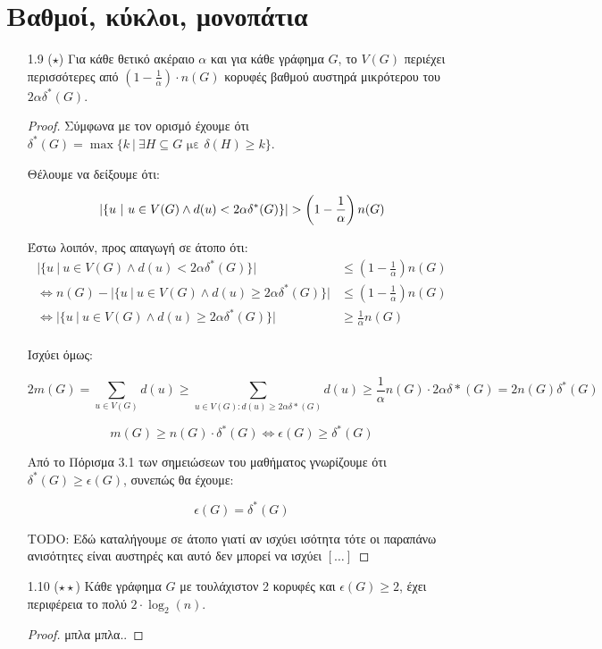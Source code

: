 \documentclass[a4paper, oneside, 11pt]{article}
\begin{document}


\section{Βαθμοί, κύκλοι, μονοπάτια}

\begin{enumerate}
\item[1.9 ($\star$)]
   Για κάθε θετικό ακέραιο $\alpha$ και για κάθε γράφημα $G$, το $V(G)$
   περιέχει περισσότερες από $\left( 1-\frac1\alpha \right) \cdot n(G)$
   κορυφές βαθμού αυστηρά μικρότερου του $2\alpha\delta^*(G)$.

   \begin{proof}
      Σύμφωνα με τον ορισμό έχουμε ότι
      $\delta^*(G) = \max \{ k\ |\ \exists H \subseteq G \text{ με }
       \delta(H) \geq k \}$.

      Θέλουμε να δείξουμε ότι:

      \[
         | \{ u\ |\ u \in V(G) \land d(u) < 2\alpha\delta^*(G) \} |
            > \left( 1 - \frac1\alpha \right) n(G)\\
      \]

      Έστω λοιπόν, προς απαγωγή σε άτοπο ότι:
      \begin{align*}
         | \{ u\ |\ u \in V(G) \land d(u) < 2\alpha\delta^*(G) \} |
            &\leq \left( 1 - \frac1\alpha \right) n(G)\\
         \Leftrightarrow
         n(G) - | \{ u\ |\ u \in V(G) \land d(u) \geq 2\alpha\delta^*(G) \} |
            &\leq \left( 1 - \frac1\alpha \right) n(G)\\ 
         \Leftrightarrow
         | \{ u\ |\ u \in V(G) \land d(u) \geq 2\alpha\delta^*(G) \} |
            &\geq \frac1\alpha n(G)\\
      \end{align*}

      Ισχύει όμως:

      \[ 2m(G) = \sum_{u \in V(G)} d(u) \geq
         \sum_{u \in V(G): d(u) \geq 2\alpha\delta*(G)} d(u)
         \geq \frac1\alpha n(G) \cdot 2\alpha\delta*(G)
         = 2n(G)\delta^*(G) \]

      \[ m(G) \geq n(G) \cdot \delta^*(G) \Leftrightarrow
         \epsilon(G) \geq \delta^*(G) \]

      Από το Πόρισμα 3.1 των σημειώσεων του μαθήματος γνωρίζουμε ότι
      $\delta^*(G) \geq \epsilon(G)$, συνεπώς θα έχουμε:

      \[ \epsilon(G) = \delta^*(G) \]

      TODO: Εδώ καταλήγουμε σε άτοπο γιατί αν ισχύει ισότητα τότε οι
      παραπάνω ανισότητες είναι αυστηρές και αυτό δεν μπορεί να ισχύει
      $[ \ldots ]$

   \end{proof}

\item[1.10 ($\star\star$)]
   Κάθε γράφημα $G$ με τουλάχιστον 2 κορυφές και
   $\epsilon(G) \geq 2$, έχει περιφέρεια το πολύ $2 \cdot \log_2 (n)$.

   \begin{proof}
      μπλα μπλα..
   \end{proof}
\end{enumerate}
\end{document}
